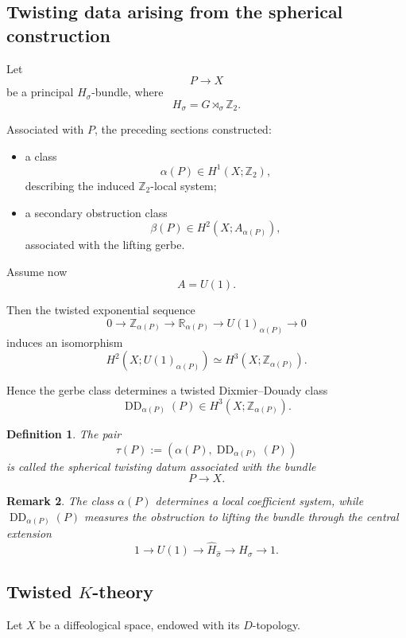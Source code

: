 \documentclass[11pt]{amsart}
\newtheorem{definition}{Definition}[section]
\newtheorem{remark}[definition]{Remark}
\begin{document}
\subsection{Twisting data arising from the spherical construction}

Let
\[
P\to X
\]
be a principal \(H_\sigma\)-bundle, where
\[
H_\sigma = G\rtimes_\sigma \mathbb Z_2.
\]

Associated with \(P\), the preceding sections constructed:

\begin{itemize}
\item a class
\[
\alpha(P)\in H^1(X;\mathbb Z_2),
\]
describing the induced \(\mathbb Z_2\)-local system;

\item a secondary obstruction class
\[
\beta(P)\in H^2(X;A_{\alpha(P)}),
\]
associated with the lifting gerbe.
\end{itemize}

Assume now
\[
A=U(1).
\]

Then the twisted exponential sequence
\[
0
\longrightarrow
\mathbb Z_{\alpha(P)}
\longrightarrow
\mathbb R_{\alpha(P)}
\longrightarrow
U(1)_{\alpha(P)}
\longrightarrow 0
\]
induces an isomorphism
\[
H^2(X;U(1)_{\alpha(P)})
\simeq
H^3(X;\mathbb Z_{\alpha(P)}).
\]

Hence the gerbe class determines a twisted Dixmier--Douady class
\[
\operatorname{DD}_{\alpha(P)}(P)
\in
H^3(X;\mathbb Z_{\alpha(P)}).
\]

\begin{definition}
The pair
\[
\tau(P)
:=
(\alpha(P),\operatorname{DD}_{\alpha(P)}(P))
\]
is called the \emph{spherical twisting datum} associated with the bundle
\[
P\to X.
\]
\end{definition}

\begin{remark}
The class \(\alpha(P)\) determines a local coefficient system, while
\(\operatorname{DD}_{\alpha(P)}(P)\) measures the obstruction to lifting the
bundle through the central extension
\[
1\to U(1)\to \widehat H_{\widehat\sigma}\to H_\sigma\to 1.
\]
\end{remark}

\subsection{Twisted \(K\)-theory}

Let \(X\) be a diffeological space, endowed with its \(D\)-topology.
\end{document}
